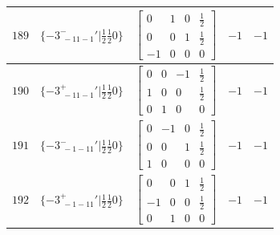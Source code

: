 \documentclass[fleqn,8pt]{jsarticle}
\begin{document}
\begin{longtable}{ccccc}
$ 189 $ & $ \{-3^{-}_{\,\,-11-1}{}'|\frac{1}{2} \frac{1}{2} 0\} $ & $ \begin{bmatrix} 0 & 1 & 0 & \frac{1}{2} \\ 0 & 0 & 1 & \frac{1}{2} \\ -1 & 0 & 0 & 0 \end{bmatrix} $ & $ -1 $ & $ -1 $ \\ \hline
$ 190 $ & $ \{-3^{+}_{\,\,-11-1}{}'|\frac{1}{2} \frac{1}{2} 0\} $ & $ \begin{bmatrix} 0 & 0 & -1 & \frac{1}{2} \\ 1 & 0 & 0 & \frac{1}{2} \\ 0 & 1 & 0 & 0 \end{bmatrix} $ & $ -1 $ & $ -1 $ \\ \hline
$ 191 $ & $ \{-3^{-}_{\,\,-1-11}{}'|\frac{1}{2} \frac{1}{2} 0\} $ & $ \begin{bmatrix} 0 & -1 & 0 & \frac{1}{2} \\ 0 & 0 & 1 & \frac{1}{2} \\ 1 & 0 & 0 & 0 \end{bmatrix} $ & $ -1 $ & $ -1 $ \\ \hline
$ 192 $ & $ \{-3^{+}_{\,\,-1-11}{}'|\frac{1}{2} \frac{1}{2} 0\} $ & $ \begin{bmatrix} 0 & 0 & 1 & \frac{1}{2} \\ -1 & 0 & 0 & \frac{1}{2} \\ 0 & 1 & 0 & 0 \end{bmatrix} $ & $ -1 $ & $ -1 $ \\
\end{longtable}
\end{document}
